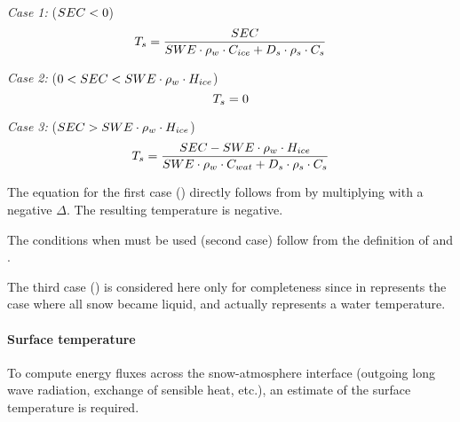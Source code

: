 \medskip\emph{Case 1: } ($SEC < 0$)
\begin{equation} \label{eqn:snow-enBal_energy-temperature-relation-allSolid}
  T_s= \frac{SEC}{SWE \cdot \rho_{w} \cdot C_{ice} + D_s \cdot \rho_s \cdot C_s}
\end{equation}

\medskip\emph{Case 2: } ($0 < SEC < SWE \cdot \rho_{w} \cdot H_{ice}$)
\begin{equation} \label{eqn:snow-enBal_energy-temperature-relation-solidAndLiquid}
  T_s= 0
\end{equation}

\medskip\emph{Case 3: } ($SEC > SWE \cdot \rho_{w} \cdot H_{ice}$)
\begin{equation} \label{eqn:snow-enBal_energy-temperature-relation-allLiquid}
  T_s= \frac{SEC - SWE \cdot \rho_{w} \cdot H_{ice}}{SWE \cdot \rho_{w} \cdot C_{wat} + D_s \cdot \rho_s \cdot C_s}
\end{equation}

The equation for the first case () directly follows from  by multiplying with a negative $\Delta$\snowEnergyContent. The resulting temperature \snowTemperature{} is negative.

The conditions when  must be used (second case) follow from the definition of \snowEnergyContent{} and .

The third case () is considered here only for completeness since in represents the case where all snow became liquid, and \snowTemperature{} actually represents a water temperature.

\paragraph{Surface temperature} To compute energy fluxes across the snow-atmosphere interface (outgoing long wave radiation, exchange of sensible heat, etc.), an estimate of the surface temperature \snowSurfaceTemperature{} is required.

